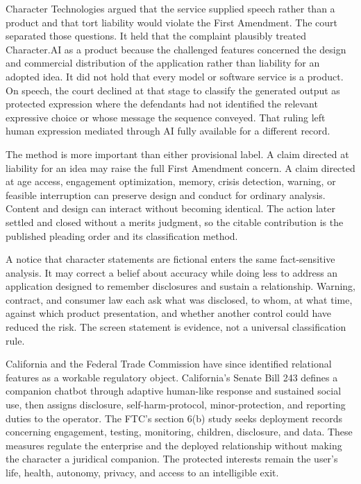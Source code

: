Character Technologies argued that the service supplied speech rather than a product and that tort liability would violate the First Amendment. The court separated those questions. It held that the complaint plausibly treated Character.AI as a product because the challenged features concerned the design and commercial distribution of the application rather than liability for an adopted idea. It did not hold that every model or software service is a product. On speech, the court declined at that stage to classify the generated output as protected expression where the defendants had not identified the relevant expressive choice or whose message the sequence conveyed. That ruling left human expression mediated through AI fully available for a different record.

The method is more important than either provisional label. A claim directed at liability for an idea may raise the full First Amendment concern. A claim directed at age access, engagement optimization, memory, crisis detection, warning, or feasible interruption can preserve design and conduct for ordinary analysis. Content and design can interact without becoming identical. The action later settled and closed without a merits judgment, so the citable contribution is the published pleading order and its classification method.

A notice that character statements are fictional enters the same fact-sensitive analysis. It may correct a belief about accuracy while doing less to address an application designed to remember disclosures and sustain a relationship. Warning, contract, and consumer law each ask what was disclosed, to whom, at what time, against which product presentation, and whether another control could have reduced the risk. The screen statement is evidence, not a universal classification rule.

California and the Federal Trade Commission have since identified relational features as a workable regulatory object. California's Senate Bill 243 defines a companion chatbot through adaptive human-like response and sustained social use, then assigns disclosure, self-harm-protocol, minor-protection, and reporting duties to the operator. The FTC's section 6(b) study seeks deployment records concerning engagement, testing, monitoring, children, disclosure, and data. These measures regulate the enterprise and the deployed relationship without making the character a juridical companion. The protected interests remain the user's life, health, autonomy, privacy, and access to an intelligible exit.

